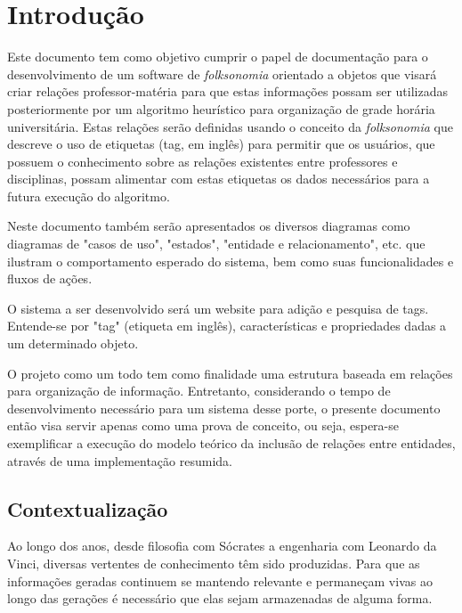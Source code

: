 \chapter{Introdução}

Este documento tem como objetivo cumprir o papel de documentação para o desenvolvimento de um software de \textit{folksonomia} orientado a objetos que visará criar relações professor-matéria para que estas informações possam ser utilizadas posteriormente por um algoritmo heurístico para organização de grade horária universitária. Estas relações serão definidas usando o conceito da \textit{folksonomia} que descreve o uso de etiquetas (tag, em inglês) para permitir que os usuários, que possuem o conhecimento sobre as relações existentes entre professores e disciplinas, possam alimentar com estas etiquetas os dados necessários para a futura execução do algoritmo.

Neste documento também serão apresentados os diversos diagramas como diagramas de "casos de uso", "estados", "entidade e relacionamento", etc. que ilustram o comportamento esperado do sistema, bem como suas funcionalidades e fluxos de ações.

O sistema a ser desenvolvido será um website para adição e pesquisa de tags. Entende-se por "tag" (etiqueta em inglês), características e propriedades dadas a um determinado objeto.

O projeto como um todo tem como finalidade uma estrutura baseada em relações para organização de informação. Entretanto, considerando o tempo de desenvolvimento necessário para um sistema desse porte, o presente documento então visa servir apenas como uma prova de conceito, ou seja, espera-se exemplificar a execução do modelo teórico da inclusão de relações entre entidades, através de uma implementação resumida.

\section{Contextualização}

    Ao longo dos anos, desde filosofia com Sócrates a engenharia com Leonardo da Vinci, diversas vertentes de conhecimento têm sido produzidas. Para que as informações geradas continuem se mantendo relevante e permaneçam vivas ao longo das gerações é necessário que elas sejam armazenadas de alguma forma.

